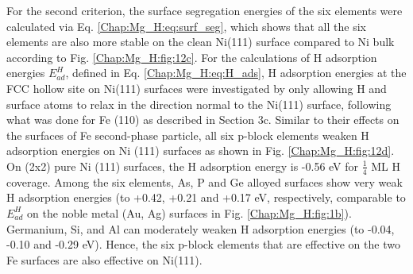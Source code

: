 For the second criterion, the surface segregation energies of the six elements were calculated via Eq. \ref{Chap:Mg_H:eq:surf_seg}, which shows that all the six elements are also more stable on the clean Ni(111) surface compared to Ni bulk according to Fig. \ref{Chap:Mg_H:fig:12c}. For the calculations of H adsorption energies $E_{ad}^H$, defined in Eq. \ref{Chap:Mg_H:eq:H_ads}, H adsorption energies at the FCC hollow site on Ni(111) surfaces were investigated by only allowing H and surface atoms to relax in the direction normal to the Ni(111) surface, following what was done for Fe (110) as described in Section 3c. Similar to their effects on the surfaces of Fe second-phase particle, all six p-block elements weaken H adsorption energies on Ni (111) surfaces as shown in Fig. \ref{Chap:Mg_H:fig:12d}. On (2x2) pure Ni (111) surfaces, the H adsorption energy is -0.56 eV for $\frac{1}{4}$ ML H coverage. Among the six elements, As, P and Ge alloyed surfaces show very weak H adsorption energies (to +0.42, +0.21 and +0.17 eV, respectively, comparable to $E_{ad}^H$ on the noble metal (Au, Ag) surfaces in Fig. \ref{Chap:Mg_H:fig:1b}). Germanium, Si, and Al can moderately weaken H adsorption energies (to -0.04, -0.10 and -0.29 eV). Hence, the six p-block elements that are effective on the two Fe surfaces are also effective on Ni(111).